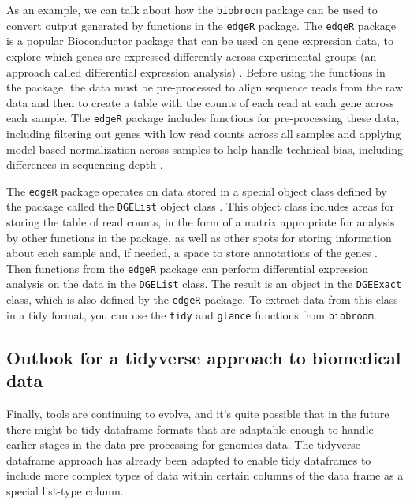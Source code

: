\documentclass[]{tufte-book}
\begin{document}
As an example, we can talk about how the \texttt{biobroom} package can be used to
convert output generated by functions in the \texttt{edgeR} package. The \texttt{edgeR}
package is a popular Bioconductor package that can be used on gene expression
data, to explore which genes are expressed differently across experimental
groups (an approach called differential expression analysis) \citep{edgeR}. Before
using the functions in the package, the data must be pre-processed to align
sequence reads from the raw data and then to create a table with the counts of
each read at each gene across each sample. The \texttt{edgeR} package includes
functions for pre-processing these data, including filtering out genes with low
read counts across all samples and applying model-based normalization across
samples to help handle technical bias, including differences in sequencing depth
\citep{chen2014edger}.

The \texttt{edgeR} package operates on data stored in a special object class defined by
the package called the \texttt{DGEList} object class \citep{chen2014edger}. This object
class includes areas for storing the table of read counts, in the form of a
matrix appropriate for analysis by other functions in the package, as well as
other spots for storing information about each sample and, if needed, a space to
store annotations of the genes \citep{chen2014edger}. Then functions from the \texttt{edgeR}
package can perform differential expression analysis on the data in the
\texttt{DGEList} class. The result is an object in the \texttt{DGEExact} class, which is also
defined by the \texttt{edgeR} package. To extract data from this class in a tidy
format, you can use the \texttt{tidy} and \texttt{glance} functions from \texttt{biobroom}.

\subsection{Outlook for a tidyverse approach to biomedical data}\label{outlook-for-a-tidyverse-approach-to-biomedical-data}

Finally, tools are continuing to evolve, and it's quite possible that in the
future there might be tidy dataframe formats that are adaptable enough to handle
earlier stages in the data pre-processing for genomics data. The tidyverse
dataframe approach has already been adapted to enable tidy dataframes to include
more complex types of data within certain columns of the data frame as a special
list-type column.
\end{document}
